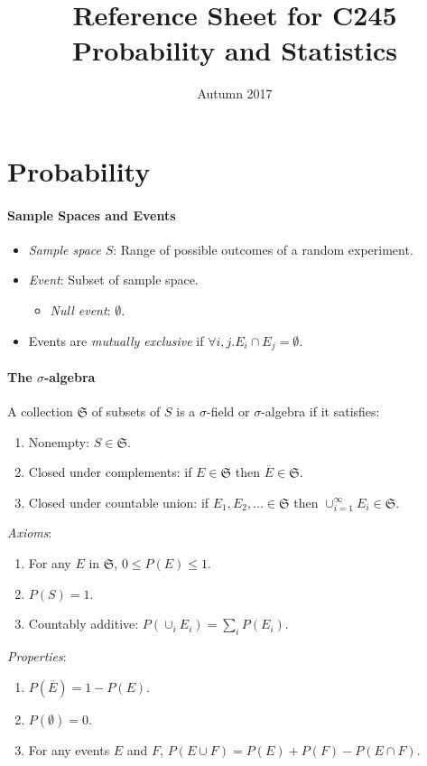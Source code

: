 \documentclass[twocolumn,english]{article}
\begin{document}
\title{Reference Sheet for C245 Probability and Statistics}

\date{Autumn 2017}
\maketitle

\section{Probability}

\paragraph{Sample Spaces and Events}
\begin{itemize}
\item \emph{Sample space} $S$: Range of possible outcomes of a random experiment.
\item \emph{Event}: Subset of sample space.
\begin{itemize}
\item \emph{Null event}: $\emptyset$.
\end{itemize}
\item Events are \emph{mutually exclusive} if $\forall i,j.E_{i}\cap E_{j}=\emptyset$.
\end{itemize}

\paragraph{The $\sigma$-algebra}

A collection $\mathfrak{S}$ of subsets of $S$ is a $\sigma$-field
or $\sigma$-algebra if it satisfies:
\begin{enumerate}
\item Nonempty: $S\in\mathfrak{S}$.
\item Closed under complements: if $E\in\mathfrak{S}$ then $\overline{E}\in\mathfrak{S}$.
\item Closed under countable union: if $E_{1},E_{2},\dots\in\mathfrak{S}$
then $\cup_{i=1}^{\infty}E_{i}\in\mathfrak{S}$.
\end{enumerate}
\emph{Axioms}:
\begin{enumerate}
\item For any $E$ in $\mathfrak{S}$, $0\leq P\left(E\right)\leq1$.
\item $P\left(S\right)=1$.
\item Countably additive: $P\left(\cup_{i}E_{i}\right)=\sum_{i}P\left(E_{i}\right)$.
\end{enumerate}
\emph{Properties}:
\begin{enumerate}
\item $P\left(\overline{E}\right)=1-P\left(E\right)$.
\item $P\left(\emptyset\right)=0$.
\item For any events $E$ and $F$, $P\left(E\cup F\right)=P\left(E\right)+P\left(F\right)-P\left(E\cap F\right)$.
\end{enumerate}
\end{document}
